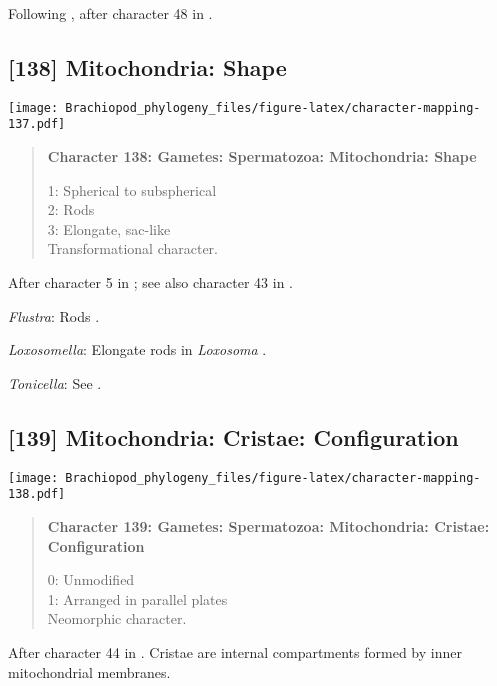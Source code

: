 \documentclass[openany]{book}
\theoremstyle{definition}
\theoremstyle{definition}
\theoremstyle{definition}
\theoremstyle{remark}
\begin{document}
Following \citet{Smith2012}, after character 48 in \citet{Ponder1997}.

\subsection*{{[}138{]} Mitochondria: Shape}\label{mitochondria-shape}

\texttt{[image: Brachiopod\_phylogeny\_files/figure-latex/character-mapping-137.pdf]}

\begin{quote}
\textbf{Character 138: Gametes: Spermatozoa: Mitochondria: Shape}

1: Spherical to subspherical\\
2: Rods\\
3: Elongate, sac-like\\
Transformational character.
\end{quote}

After character 5 in \citet{BucklandNicks2008}; see also character 43 in
\citet{Ponder1997}.

\hypertarget{Flustra-coding-138}{}
\emph{Flustra}: Rods \citep{Franzen1981}.

\hypertarget{Loxosomella-coding-138}{}
\emph{Loxosomella}: Elongate rods in \emph{Loxosoma}
\citep{Franzen2000}.

\hypertarget{Tonicella-coding-138}{}
\emph{Tonicella}: See \citet{BucklandNicks1988}.

\subsection*{{[}139{]} Mitochondria: Cristae:
Configuration}\label{mitochondria-cristae-configuration}

\texttt{[image: Brachiopod\_phylogeny\_files/figure-latex/character-mapping-138.pdf]}

\begin{quote}
\textbf{Character 139: Gametes: Spermatozoa: Mitochondria: Cristae:
Configuration}

0: Unmodified\\
1: Arranged in parallel plates\\
Neomorphic character.
\end{quote}

After character 44 in \citet{Ponder1997}. Cristae are internal
compartments formed by inner mitochondrial membranes.
\end{document}
